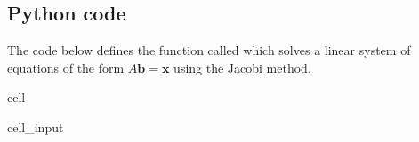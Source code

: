 \documentclass[letterpaper,10pt,english]{jupyterBook}
\begin{document}
\subsection{Python code}
\label{\detokenize{7_Indirect_methods/7.1_Jacobi_method:python-code}}
\sphinxAtStartPar
The code below defines the function called  which solves a linear system of equations of the form \(A \mathbf{b} = \mathbf{x}\) using the Jacobi method.

\begin{sphinxuseclass}{cell}\begin{sphinxVerbatimInput}

\begin{sphinxuseclass}{cell_input}
\begin{sphinxVerbatim}[commandchars=\\\{\}]
   

   
      
      
      
       
          
           
              \PYG{p}{[}\PYG{p}{]}
               
                   
                      \PYG{p}{[}\PYG{p}{]}  \PYG{p}{[}\PYG{p}{]}
        
            \PYG{p}{[}\PYG{p}{]}    \PYG{p}{[}\PYG{p}{]}
            
                
           
    
     
\end{sphinxVerbatim}

\end{sphinxuseclass}\end{sphinxVerbatimInput}

\end{sphinxuseclass}
\end{document}

